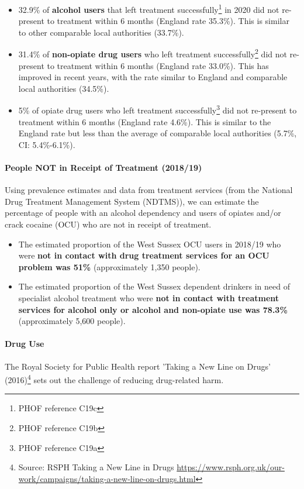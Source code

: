 \begin{itemize}[noitemsep]
    \item 32.9\% of {\bfseries alcohol users} that left treatment successfully\footnote{PHOF reference C19c} in 2020 did not re-present to treatment within 6 months (England rate 35.3\%). This is similar to other comparable local authorities (33.7\%).
    \item 31.4\% of {\bfseries non-opiate drug users} who left treatment successfully\footnote{PHOF reference C19b} did not re-present to treatment within 6 months (England rate 33.0\%). This has improved in recent years, with the rate similar to England and comparable local authorities (34.5\%).
    \item 5\% of opiate drug users who left treatment successfully\footnote{PHOF reference C19a} did not re-present to treatment within 6 months (England rate 4.6\%). This is similar to the England rate but less than the average of  comparable local authorities (5.7\%, CI: 5.4\%-6.1\%).
\end{itemize}

\paragraph{People NOT in Receipt of Treatment (2018/19)} Using prevalence estimates and data from treatment services (from the National Drug Treatment Management System (NDTMS)), we can estimate the percentage of people with an alcohol dependency and users of opiates and/or crack cocaine (OCU) who are not in receipt of treatment.

\begin{itemize}[noitemsep]
    \item The estimated proportion of the West Sussex OCU users in 2018/19 who were {\bfseries not in contact with drug treatment services for an OCU problem was 51\%} (approximately 1,350 people).
    \item The estimated proportion of the West Sussex dependent drinkers in need of specialist alcohol treatment who were {\bfseries not in contact with treatment services for alcohol only or alcohol and non-opiate use was 78.3\%} (approximately 5,600 people).
\end{itemize}
 
\paragraph{Drug Use} The Royal Society for Public Health report 'Taking a New Line on Drugs' (2016)\footnote{Source: RSPH Taking a New Line in Drugs \url{https://www.rsph.org.uk/our-work/campaigns/taking-a-new-line-on-drugs.html}} sets out the challenge of reducing drug-related harm.

